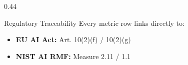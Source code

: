 \begin{frame}
\begin{columns}[T]
\begin{column}{0.44\textwidth}
      \vspace{0.1cm}
      \begin{successcard}{Regulatory Traceability}
        \scriptsize
        Every metric row links directly to:
        \begin{itemize}\tiny
          \item \textbf{EU AI Act:} Art. 10(2)(f) / 10(2)(g)
          \item \textbf{NIST AI RMF:} Measure 2.11 / 1.1
        \end{itemize}
      \end{successcard}
    \end{column}
  \end{columns}
\end{frame}
